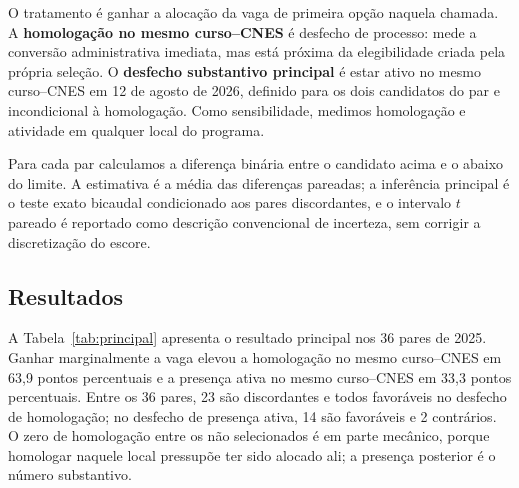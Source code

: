 \documentclass[11pt,a4paper]{article}
\begin{document}
O tratamento é ganhar a alocação da vaga de primeira opção naquela chamada. A
\textbf{homologação no mesmo curso--CNES} é desfecho de processo: mede a
conversão administrativa imediata, mas está próxima da elegibilidade criada
pela própria seleção. O \textbf{desfecho substantivo principal} é estar ativo
no mesmo curso--CNES em 12 de agosto de 2026, definido para os dois candidatos
do par e incondicional à homologação. Como sensibilidade, medimos homologação e
atividade em qualquer local do programa.

Para cada par calculamos a diferença binária entre o candidato acima e o abaixo
do limite. A estimativa é a média das diferenças pareadas; a inferência
principal é o teste exato bicaudal condicionado aos pares discordantes, e o
intervalo $t$ pareado é reportado como descrição convencional de incerteza, sem
corrigir a discretização do escore.

\subsection{Resultados}

A Tabela~\ref{tab:principal} apresenta o resultado principal nos 36 pares de
2025. Ganhar marginalmente a vaga elevou a homologação no mesmo curso--CNES em
63,9 pontos percentuais e a presença ativa no mesmo curso--CNES em 33,3 pontos
percentuais. Entre os 36 pares, 23 são discordantes e todos favoráveis no
desfecho de homologação; no desfecho de presença ativa, 14 são favoráveis e 2
contrários. O zero de homologação entre os não selecionados é em parte
mecânico, porque homologar naquele local pressupõe ter sido alocado ali; a
presença posterior é o número substantivo.
\end{document}
